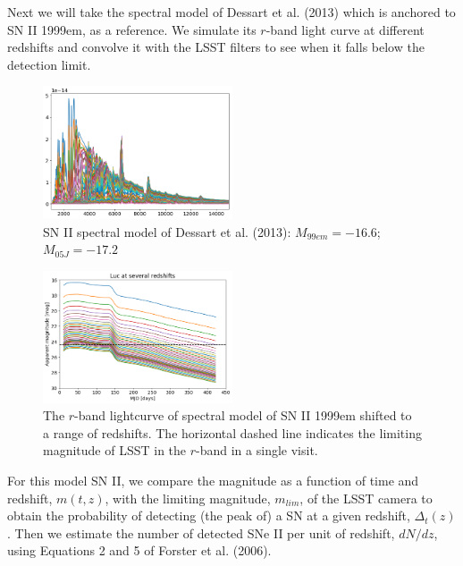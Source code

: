 \documentclass[12pt, onecolumn]{emulateapj}
\begin{document}
Next we will take the spectral model of Dessart et al. (2013) which is anchored to SN II 1999em, as a reference. We simulate its $r$-band light curve at different redshifts and convolve it with the LSST filters to see when it falls below the detection limit.

\begin{figure}
	\begin{center}
		\includegraphics[width=0.5\textwidth]{spectral_model_SNII.png}
		\caption{SN II spectral model of Dessart et al. (2013): $M_{99em}=-16.6$; $M_{05J}=-17.2$}
		\label{fig:SNII_lc}
	\end{center}
\end{figure}

\begin{figure}
	\begin{center}
		\includegraphics[width=0.5\textwidth]{SNII_lc_withz.png}
		\caption{The $r$-band lightcurve of spectral model of SN II 1999em shifted to a range of redshifts. The horizontal dashed line indicates the limiting magnitude of LSST in the $r$-band in a single visit.}
		\label{fig:SNII_lc_wz}
	\end{center}
\end{figure}

For this model SN II, we compare the magnitude as a function of time and redshift, $m(t,z)$, with the limiting magnitude, $m_{lim}$, of the LSST camera to obtain the probability of detecting (the peak of) a SN at a given redshift, $\Delta_{t}(z)$. Then we estimate the number of detected SNe II per unit of redshift, $dN/dz$, using Equations 2 and 5 of Forster et al. (2006).
\end{document}
